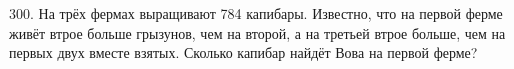 300. На трёх фермах выращивают 784 капибары. Известно, что на первой ферме живёт втрое больше грызунов, чем на второй, а на третьей втрое больше, чем на первых двух вместе взятых. Сколько капибар найдёт Вова на первой ферме?\\
